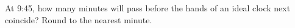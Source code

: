 At 9:45, how many minutes will pass before the hands of an ideal clock next coincide? Round to the nearest minute.
